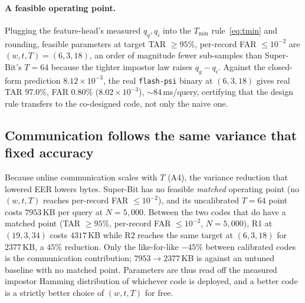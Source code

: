 \paragraph{A feasible operating point.} Plugging the feature-head's measured $q_g, q_i$ into the
$T_{\min}$ rule~\eqref{eq:tmin} and rounding, feasible parameters at target TAR $\geq 95\%$, per-record
FAR $\leq 10^{-2}$ are $(w,t,T)=(6,3,18)$, an order of magnitude fewer sub-samples than Super-Bit's
$T=64$ because the tighter impostor law raises $q_g-q_i$. Against the closed-form prediction
$8.12\times10^{-3}$, the real \texttt{flash-psi} binary at $(6,3,18)$ gives real TAR $97.0\%$, FAR
$0.80\%$ ($8.02\times10^{-3}$), $\sim\!84$\,ms/query, certifying that the design rule transfers to the
co-designed code, not only the naive one.

\subsection{Communication follows the same variance that fixed accuracy}
\label{sec:comms}

Because online communication scales with $T$ (A4), the variance reduction that lowered EER lowers
bytes. Super-Bit has no feasible \emph{matched} operating point (no $(w,t,T)$ reaches per-record FAR
$\leq10^{-2}$), and its uncalibrated $T=64$ point costs $7953$\,KB per query at $N=5{,}000$. Between the
two codes that do have a matched point (TAR $\geq95\%$, per-record FAR $\leq10^{-2}$, $N=5{,}000$), R1 at
$(19,3,34)$ costs $4317$\,KB while R2 reaches the same target at $(6,3,18)$ for $2377$\,KB, a $45\%$
reduction. Only the like-for-like $-45\%$ between calibrated codes is the communication contribution;
$7953\to2377$\,KB is against an untuned baseline with no matched point. Parameters are thus read off the
measured impostor Hamming distribution of whichever code is deployed, and a better code is a strictly
better choice of $(w,t,T)$ for free.
